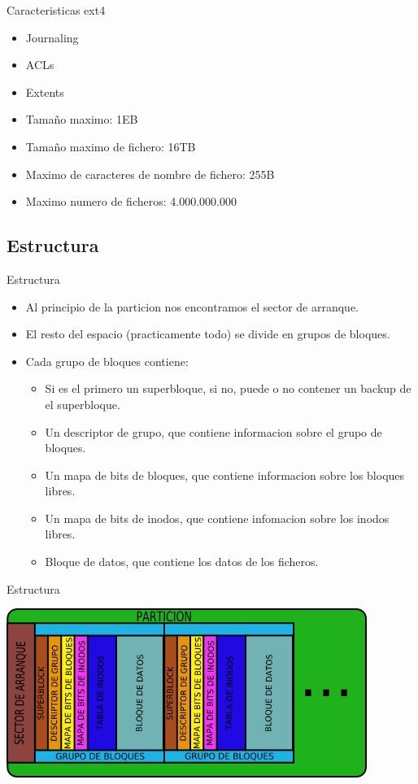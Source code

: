 \begin{frame}{Caracteristicas ext4}
  \begin{itemize}
    \item Journaling
    \item ACLs
    \item Extents
    \item Tamaño maximo: 1EB
    \item Tamaño maximo de fichero: 16TB
    \item Maximo de caracteres de nombre de fichero: 255B
    \item Maximo numero de ficheros: 4.000.000.000
  \end{itemize}
\end{frame}

\subsection{Estructura}
\begin{frame}{Estructura}
  \begin{itemize}
    \item Al principio de la particion nos encontramos el sector de arranque.
    \item El resto del espacio (practicamente todo) se divide en grupos de bloques.
    \item Cada grupo de bloques contiene:
    \begin{itemize}
      \item Si es el primero un superbloque, si no, puede o no contener un backup de el superbloque.
      \item Un descriptor de grupo, que contiene informacion sobre el grupo de bloques.
      \item Un mapa de bits de bloques, que contiene informacion sobre los bloques libres.
      \item Un mapa de bits de inodos, que contiene infomacion sobre los inodos libres.
      \item Bloque de datos, que contiene los datos de los ficheros.
    \end{itemize}
  \end{itemize}
\end{frame}

\begin{frame}{Estructura}
  \begin{center}
    \includegraphics[height=5.5cm]{imgs/ext_struct.png}
  \end{center}
\end{frame}

